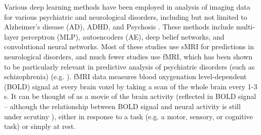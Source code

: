 \documentclass{article}
\begin{document}
Various deep learning methods have been employed in analysis of imaging data for various psychiatric and neurological disorders, including but not limited to Alzheimer’s disease (AD), ADHD, and Psychosis \citep[see][for a review]{Vieira2017}. These methods include multi-layer perceptron (MLP), autoencoders (AE), deep belief networks, and convolutional neural networks. Most of these studies use sMRI for predictions in neurological disorders, and much fewer studies use fMRI, which has been shown to be particularly relevant in predictive analysis of psychiatric disorders (such as schizophrenia) (e.g. \citep{Damaraju2014, Calhoun2009}). fMRI data measures blood oxygenation level-dependent (BOLD) signal at every brain voxel by taking a scan of the whole brain every 1-3 s. It can be thought of as a movie of the brain activity (reflected in BOLD signal – although the relationship between BOLD signal and neural activity is still under scrutiny \citep{RN1}), either in response to a task (e.g. a motor, sensory, or cognitive task) or simply at rest.
\end{document}
